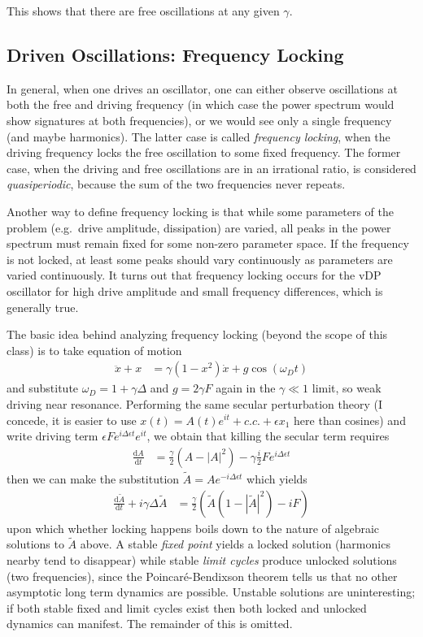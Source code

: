 \documentclass[10pt]{article}
\newcommand{\rd}[2]{\frac{\mathrm{d}#1}{\mathrm{d}#2}}
\newcommand{\abs}[1]{\left|#1\right|}
\begin{document}
This shows that there are free oscillations at any given $\gamma$.

\subsection{Driven Oscillations: Frequency Locking}

In general, when one drives an oscillator, one can either observe oscillations
at both the free and driving frequency (in which case the power spectrum would
show signatures at both frequencies), or we would see only a single frequency
(and maybe harmonics). The latter case is called \emph{frequency locking}, when
the driving frequency locks the free oscillation to some fixed frequency. The
former case, when the driving and free oscillations are in an irrational ratio,
is considered \emph{quasiperiodic}, because the sum of the two frequencies never
repeats.

Another way to define frequency locking is that while some parameters of the
problem (e.g.\ drive amplitude, dissipation) are varied, all peaks in the power
spectrum must remain fixed for some non-zero parameter space. If the frequency
is not locked, at least some peaks should vary continuously as parameters are
varied continuously. It turns out that frequency locking occurs for the vDP
oscillator for high drive amplitude and small frequency differences, which is
generally true.

The basic idea behind analyzing frequency locking (beyond the scope of this
class) is to take equation of motion
\begin{align}
    \ddot{x} + x &= \gamma(1-x^2)\dot{x} + g\cos(\omega_D t)
\end{align}
and substitute $\omega_D = 1 + \gamma \Delta$ and $g = 2\gamma F$ again in the
$\gamma \ll 1$ limit, so weak driving near resonance. Performing the same
secular perturbation theory (I concede, it is easier to use $x(t) = A(t)e^{it} +
c.c. + \epsilon x_1$ here than cosines) and write driving term $\epsilon F e^{i
\Delta \epsilon t}e^{it}$, we obtain that killing the secular term requires
\begin{align}
    \rd{A}{t} &= \frac{\gamma}{2}\left( A - \abs{A}^2 \right) -
    \gamma\frac{i}{2}Fe^{i\Delta \epsilon t}
\end{align}
then we can make the substitution $\tilde{A} = Ae^{-i\Delta \epsilon t}$ which
yields
\begin{align}
    \rd{\tilde{A}}{t} + i\gamma \Delta \tilde{A} &= \frac{\gamma}{2}\left(
    \tilde{A}(1-\abs{\tilde{A}}^2) - iF \right)
\end{align}
upon which whether locking happens boils down to the nature of algebraic
solutions to $\tilde{A}$ above. A stable \emph{fixed point} yields a locked
solution (harmonics nearby tend to disappear) while stable \emph{limit cycles}
produce unlocked solutions (two frequencies), since the Poincar\'e-Bendixson
theorem tells us that no other asymptotic long term dynamics are possible.
Unstable solutions are uninteresting; if both stable fixed and limit cycles
exist then both locked and unlocked dynamics can manifest. The remainder of this
is omitted.
\end{document}
